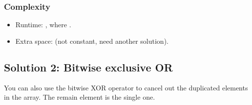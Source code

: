 \documentclass[letterpaper,12pt,english]{book}
\begin{document}
\begin{sphinxVerbatim}[commandchars=\\\{\}]
\end{sphinxVerbatim}

\begin{sphinxVerbatim}[commandchars=\\\{\}]
\end{sphinxVerbatim}


\subsubsection{Complexity}
\label{\detokenize{Counting/136_Single_Number:complexity}}\begin{itemize}
\item {} 
\sphinxAtStartPar
Runtime: , where .

\item {} 
\sphinxAtStartPar
Extra space:  (not constant, need another solution).

\end{itemize}


\subsection{Solution 2: Bitwise exclusive OR}
\label{\detokenize{Counting/136_Single_Number:solution-2-bitwise-exclusive-or}}
\sphinxAtStartPar
You can also use the bitwise XOR operator to cancel out the duplicated elements in the array. The remain element is the single one.
\end{document}
